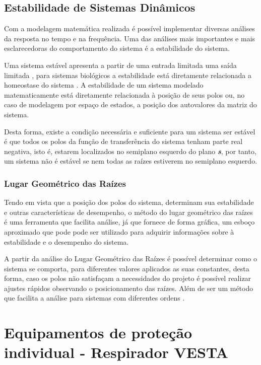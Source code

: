 \subsection{Estabilidade de Sistemas Dinâmicos}

Com a modelagem matemática realizada é possível implementar diversas análises da resposta no tempo e na frequência. Uma das análises mais importantes e mais esclarecedoras do comportamento do sistema é a estabilidade do sistema.

Uma sistema estável apresenta a partir de uma entrada limitada uma saída limitada \cite{dorf}, para sistemas biológicos a estabilidade está diretamente relacionada a homeostase do sistema \cite{Khoo2000}. A estabilidade de um sistema modelado matematicamente está diretamente relacionada à posição de seus polos ou, no caso de modelagem por espaço de estados, a posição dos autovalores da matriz do sistema.

Desta forma, existe a condição necessária e suficiente para um sistema ser estável é que todos os polos da função de transferência do sistema tenham parte real negativa, isto é, estarem localizados no semiplano esquerdo do plano \textit{\textbf{s}}, por tanto, um sistema não é estável se nem todas as raízes estiverem no semiplano esquerdo.

\subsubsection{Lugar Geométrico das Raízes}

Tendo em vista que a posição dos polos do sistema, determinam sua estabilidade e outras características de desempenho, o método do lugar geométrico das raízes é uma ferramenta que facilita análise, já que fornece de forma gráfica, um esboço aproximado que pode pode ser utilizado para adquirir informações sobre à estabilidade e o desempenho do sistema.

A partir da análise do Lugar Geométrico das Raízes é possível determinar como o sistema se comporta, para diferentes valores aplicados as suas constantes, desta forma, caso os polos não satisfaçam a necessidades do projeto é possível realizar ajustes rápidos observando o posicionamento das raízes. Além de ser um método que facilita a análise para sistemas com diferentes ordens \cite{Aguirre2004}.

\section{Equipamentos de proteção individual - Respirador  VESTA}


